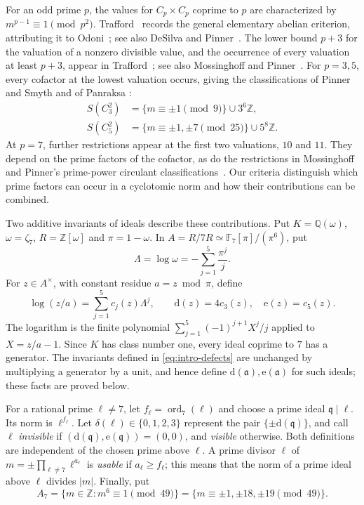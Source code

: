 \documentclass[11pt]{amsart}
\theoremstyle{plain}
\theoremstyle{definition}
\numberwithin{equation}{section}
\DeclareMathOperator{\ord}{ord}
\newcommand{\Z}{\mathbb Z}
\newcommand{\Q}{\mathbb Q}
\newcommand{\F}{\mathbb F}
\newcommand{\qq}{\mathfrak q}
\newcommand{\dd}{\mathrm d}
\newcommand{\ee}{\mathrm e}
\begin{document}
For an odd prime $p$, the values for $C_p\times C_p$ coprime to
$p$ are characterized by $m^{p-1}\equiv1\pmod{p^2}$.
Trafford~\cite[Theorem~12]{Trafford1992} records the general
elementary abelian criterion, attributing it to Odoni~\cite{Odoni1983};
see also DeSilva and Pinner~\cite[Lemmas~2.1--2.2]{DeSilvaPinner2014}.
The lower bound $p+3$ for the valuation of a nonzero divisible
value, and the occurrence of every valuation at least $p+3$,
appear in Trafford~\cite[Lemma~13]{Trafford1992}; see also
Mossinghoff and Pinner~\cite[Theorem~2.1]{MossinghoffPinnerHeisenberg}.
For $p=3,5$, every cofactor at the lowest valuation occurs, giving
the classifications of Pinner and Smyth
\cite[Theorem~6.1]{PinnerSmyth2020} and of Panraksa
\cite[Corollary~1.2]{Panraksa2026}:
\begin{align*}
 S(C_3^2)&=\{m\equiv\pm1\pmod9\}\cup3^6\Z,\\
 S(C_5^2)&=\{m\equiv\pm1,\pm7\pmod{25}\}\cup5^8\Z.
\end{align*}
At $p=7$, further restrictions appear at the first two valuations,
$10$ and $11$. They depend on the prime factors of the cofactor,
as do the restrictions in Mossinghoff and Pinner's prime-power
circulant classifications~\cite{MossinghoffPinner2022}.
Our criteria distinguish which prime factors can occur in a
cyclotomic norm and how their contributions can be combined.

Two additive invariants of ideals describe these contributions. Put
$K=\Q(\omega)$, $\omega=\zeta_7$, $R=\Z[\omega]$ and
$\pi=1-\omega$. In
$A=R/7R\simeq\F_7[\pi]/(\pi^6)$, put
\[
 \Lambda=\log\omega=-\sum_{j=1}^5\frac{\pi^j}{j}.
\]
For $z\in A^\times$, with constant residue $a=z\bmod\pi$, define
\begin{equation}\label{eq:intro-defects}
 \log(z/a)=\sum_{j=1}^5c_j(z)\Lambda^j,
 \qquad \dd(z)=4c_3(z),\quad\ee(z)=c_5(z).
\end{equation}
The logarithm is the finite polynomial
$\sum_{j=1}^5(-1)^{j+1}X^j/j$ applied to $X=z/a-1$.
Since $K$ has class number one, every ideal coprime to $7$ has a
generator. The invariants defined in \eqref{eq:intro-defects} are unchanged
by multiplying a generator by a unit, and hence define
$\dd(\mathfrak a),\ee(\mathfrak a)$ for such ideals; these facts
are proved below.

For a rational prime $\ell\ne7$, let $f_\ell=\ord_7(\ell)$ and
choose a prime ideal $\qq\mid\ell$. Its norm is $\ell^{f_\ell}$.
Let $\delta(\ell)\in\{0,1,2,3\}$ represent the pair
$\{\pm\dd(\qq)\}$, and call $\ell$ \emph{invisible} if
$(\dd(\qq),\ee(\qq))=(0,0)$, and \emph{visible} otherwise.
Both definitions are independent of
the chosen prime above $\ell$. A prime divisor $\ell$ of
$m=\pm\prod_{\ell\ne7}\ell^{a_\ell}$ is \emph{usable} if
$a_\ell\ge f_\ell$; this means that the norm of a prime ideal above
$\ell$ divides $|m|$. Finally, put
\[
 A_7=\{m\in\Z:m^6\equiv1\pmod{49}\}
     =\{m\equiv\pm1,\pm18,\pm19\pmod{49}\}.
\]
\end{document}
